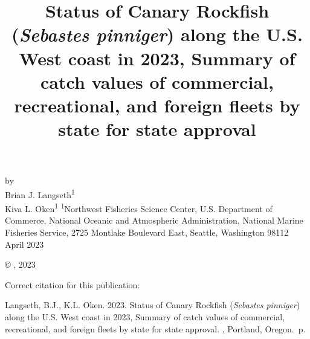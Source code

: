 \documentclass[11pt,
  english,
  letterpaper,
]{article}
\date{}
\newcommand{\trTitle}{Status of Canary Rockfish (\emph{Sebastes pinniger}) along the U.S. West coast in 2023, Summary of catch values of commercial, recreational, and foreign fleets by state for state approval}
\newcommand{\trYear}{2023}
\newcommand{\trMonth}{April}
\newcommand{\trAuthsBack}{Langseth, B.J., K.L. Oken}
\newcommand{\trCitation}{
\begin{hangparas}{1em}{1}
\trAuthsBack{}. \trYear{}. \trTitle{}. \glsentrylong{pfmc}, Portland, Oregon. \pageref{LastPage}{}\,p.
\end{hangparas}}
\begin{document}

\renewcommand*{\thefootnote}{\fnsymbol{footnote}}

\small
\thispagestyle{empty}
\noindent
\begin{center}
\title{Status of Canary Rockfish (\emph{Sebastes pinniger}) along the U.S. West coast in 2023, Summary of catch values of commercial, recreational, and foreign fleets by state for state approval}
\vspace{1.5cm}
{\Large\textbf{}}
\vfill
by\\
Brian J. Langseth\textsuperscript{1}\\
Kiva L. Oken\textsuperscript{1}\vfill
\textsuperscript{1}Northwest Fisheries Science Center, U.S. Department of Commerce, National Oceanic and Atmospheric Administration, National Marine Fisheries Service, 2725 Montlake Boulevard East, Seattle, Washington 98112\vfill
\trMonth{} \trYear{}
\end{center}
\clearpage

\thispagestyle{empty}
\vspace*{\fill}
\begin{center}
\copyright{} , \trYear{}\\
\end{center}
\par
\bigskip
\noindent
Correct citation for this publication:
\bigskip
\par
\trCitation{}
\clearpage


\tableofcontents\clearpage
\label{TRlastRoman}
\clearpage

\newpage
\thispagestyle{empty} %

\pagestyle{plain}  %
\renewcommand*{\thefootnote}{\arabic{footnote}}  %
\setcounter{footnote}{0}  %
\renewcommand{\headrulewidth}{0.5pt}
\renewcommand{\footrulewidth}{0.5pt}
\end{document}
